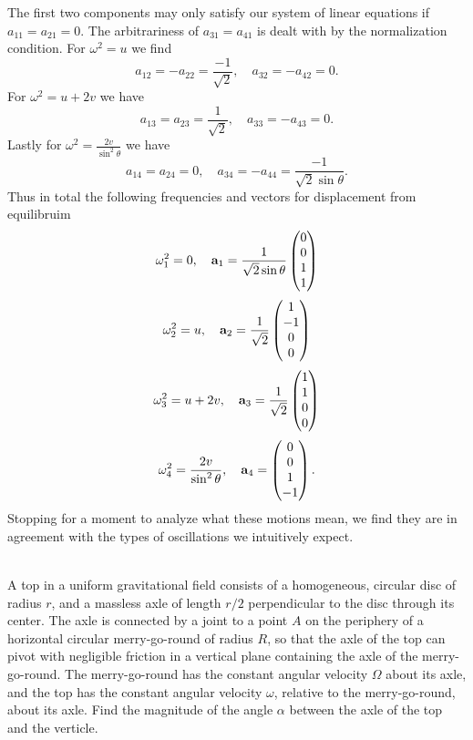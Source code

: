 \documentclass[11pt,letterpaper]{article}
\begin{document}
		The first two components may only satisfy our system of linear equations if $a_{11} = a_{21} = 0$. The arbitrariness of 
		$a_{31} = a_{41}$ is dealt with by the normalization condition. For $\omega^2 = u$ we find
		\[
			a_{12} = -a_{22} = \frac{-1}{\sqrt 2},\quad a_{32} = -a_{42} = 0. 
		\]
		For $\omega^2 = u+2v$ we have
		\[
			a_{13} = a_{23} = \frac{1}{\sqrt 2},\quad a_{33} = -a_{43} = 0.
		\]
		Lastly for $\omega^2 = \frac{2v}{\sin^2\theta}$ we have
		\[
			a_{14}=a_{24} = 0,\quad a_{34} = -a_{44}= \frac{-1}{\sqrt 2\sin\theta}.
		\]
		Thus in total the following frequencies and vectors for displacement from equilibruim
		\[
			\omega_1^2 = 0,\quad \mathbf{a}_1 = \frac{1}{\sqrt 2\sin\theta} \begin{pmatrix} 0\\0\\1\\1 \end{pmatrix}
		\]
		\[
			\omega_2^2 = u,\quad \mathbf{a}_2 = \frac{1}{\sqrt 2}\begin{pmatrix} 1\\-1\\0\\0\end{pmatrix}
		\]
		\[
			\omega_3^2 = u+2v,\quad \mathbf{a}_3 = \frac{1}{\sqrt 2} \begin{pmatrix} 1\\1\\0\\0 \end{pmatrix}
		\]
		\[
			\omega_4^2 = \frac{2v}{\sin^2\theta},\quad \mathbf{a}_4 =  \begin{pmatrix} 0\\0\\1\\-1 \end{pmatrix}.
		\]
		Stopping for a moment to analyze what these motions mean, we find they are in agreement with the types of oscillations we
		intuitively expect.
		\\
		\\
		\item
		A top in a uniform gravitational field consists of a homogeneous, circular disc of radius $r$, and a massless axle of length $r/2$
		perpendicular to the disc through its center. The axle is connected by a joint to a point $A$ on the periphery of a horizontal circular
		merry-go-round of radius $R$, so that the axle of the top can pivot with negligible friction in a vertical plane containing the axle of the
		merry-go-round. The merry-go-round has the constant angular velocity $\Omega$ about its axle, and the top has the constant angular
		velocity $\omega$, relative to the merry-go-round, about its axle. Find the magnitude of the angle $\alpha$ between the axle of the top
		and the verticle.
		
		
\end{document}

